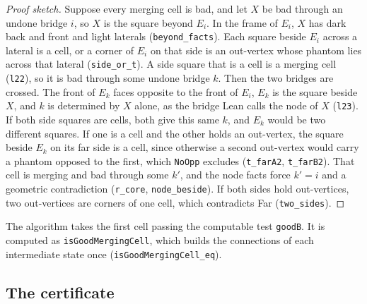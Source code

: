 \documentclass[11pt]{article}
\theoremstyle{plain}
\theoremstyle{definition}
\theoremstyle{remark}
\newcommand{\lean}[1]{\texttt{#1}}
\begin{document}
\begin{proof}[Proof sketch]
Suppose every merging cell is bad, and let $X$ be bad through an undone bridge $i$, so $X$ is the
square beyond $E_i$.
In the frame of $E_i$, $X$ has dark back and front and light laterals (\lean{beyond\_facts}).
Each square beside $E_i$ across a lateral is a cell, or a corner of $E_i$ on that side is an
out-vertex whose phantom lies across that lateral (\lean{side\_or\_t}).
A side square that is a cell is a merging cell (\lean{l22}), so it is bad through some undone bridge
$k$.
Then the two bridges are crossed.
The front of $E_k$ faces opposite to the front of $E_i$, $E_k$ is the square beside $X$, and $k$ is
determined by $X$ alone, as the bridge Lean calls the node of $X$ (\lean{l23}).
If both side squares are cells, both give this same $k$, and $E_k$ would be two different
squares.
If one is a cell and the other holds an out-vertex, the square beside $E_k$ on its far side is a
cell, since otherwise a second out-vertex would carry a phantom opposed to the first, which
\lean{NoOpp} excludes (\lean{t\_farA2}, \lean{t\_farB2}).
That cell is merging and bad through some $k'$, and the node facts force $k'=i$ and a geometric
contradiction (\lean{r\_core}, \lean{node\_beside}).
If both sides hold out-vertices, two out-vertices are corners of one cell, which contradicts Far
(\lean{two\_sides}).
\end{proof}
The algorithm takes the first cell passing the computable test \lean{goodB}.
It is computed as \lean{isGoodMergingCell}, which builds the connections of each intermediate state
once (\lean{isGoodMergingCell\_eq}).

\subsection{The certificate}
\end{document}
